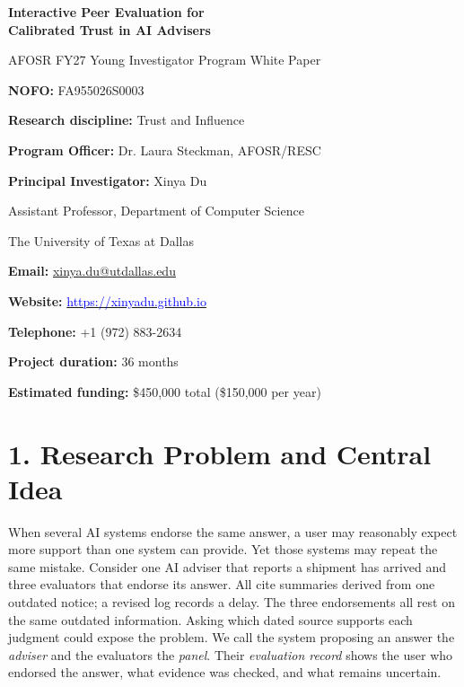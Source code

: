 \documentclass[12pt]{article}
\begin{document}
\begin{titlepage}
\thispagestyle{empty}
\begin{center}
\vspace*{0.9in}
{\Large\bfseries Interactive Peer Evaluation for\\Calibrated Trust in AI Advisers\par}
\vspace{0.45in}
{\large AFOSR FY27 Young Investigator Program White Paper\par}
\vspace{0.5in}
\end{center}

\noindent\textbf{NOFO:} FA955026S0003\par
\noindent\textbf{Research discipline:} Trust and Influence\par
\noindent\textbf{Program Officer:} Dr. Laura Steckman, AFOSR/RESC\par
\vspace{0.3in}
\noindent\textbf{Principal Investigator:} Xinya Du\par
\noindent Assistant Professor, Department of Computer Science\par
\noindent The University of Texas at Dallas\par
\noindent\textbf{Email:} \href{mailto:xinya.du@utdallas.edu}{xinya.du@utdallas.edu}\par
\noindent\textbf{Website:} \href{https://xinyadu.github.io}{\textcolor{blue}{https://xinyadu.github.io}}\par
\noindent\textbf{Telephone:} +1 (972) 883-2634\par
\vspace{0.3in}
\noindent\textbf{Project duration:} 36 months\par
\noindent\textbf{Estimated funding:} \$450,000 total (\$150,000 per year)\par
\vspace{0.3in}
\vfill
\end{titlepage}

\setcounter{page}{1}
\hypersetup{pageanchor=true}

\section*{1. Research Problem and Central Idea}

When several AI systems endorse the same answer, a user may reasonably expect more support than one system can provide. Yet those systems may repeat the same mistake. Consider one AI adviser that reports a shipment has arrived and three evaluators that endorse its answer. All cite summaries derived from one outdated notice; a revised log records a delay. The three endorsements all rest on the same outdated information. Asking which dated source supports each judgment could expose the problem. We call the system proposing an answer the \emph{adviser} and the evaluators the \emph{panel}. Their \emph{evaluation record} shows the user who endorsed the answer, what evidence was checked, and what remains uncertain.
\end{document}

